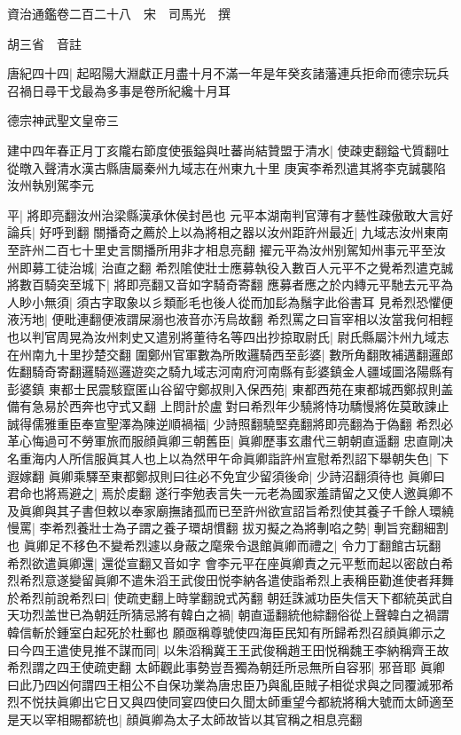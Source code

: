 資治通鑑卷二百二十八　宋　司馬光　撰

胡三省　音註

唐紀四十四|{
	起昭陽大淵獻正月盡十月不滿一年是年癸亥諸藩連兵拒命而德宗玩兵召禍日尋干戈最為多事是卷所紀纔十月耳}


德宗神武聖文皇帝三

建中四年春正月丁亥隴右節度使張鎰與吐蕃尚結贊盟于清水|{
	使疎吏翻鎰弋質翻吐從暾入聲清水漢古縣唐屬秦州九域志在州東九十里}
庚寅李希烈遣其將李克誠襲陷汝州執别駕李元

平|{
	將即亮翻汝州治梁縣漢承休侯封邑也}
元平本湖南判官薄有才藝性疎傲敢大言好論兵|{
	好呼到翻}
關播奇之薦於上以為將相之器以汝州距許州最近|{
	九域志汝州東南至許州二百七十里史言關播所用非才相息亮翻}
擢元平為汝州别駕知州事元平至汝州即募工徒治城|{
	治直之翻}
希烈隂使壯士應募執役入數百人元平不之覺希烈遣克誠將數百騎突至城下|{
	將即亮翻又音如字騎奇寄翻}
應募者應之於内縳元平馳去元平為人眇小無須|{
	須古字取象以彡類耏毛也後人從而加髟為鬚字此俗書耳}
見希烈恐懼便液汚地|{
	便毗連翻便液謂屎溺也液音亦汚烏故翻}
希烈罵之曰盲宰相以汝當我何相輕也以判官周晃為汝州刺史又遣别將董待名等四出抄掠取尉氏|{
	尉氏縣屬汴州九域志在州南九十里抄楚交翻}
圍鄭州官軍數為所敗邏騎西至彭婆|{
	數所角翻敗補邁翻邏郎佐翻騎奇寄翻邏騎廵邏遊奕之騎九域志河南府河南縣有彭婆鎮金人疆域圖洛陽縣有彭婆鎮}
東都士民震駭竄匿山谷留守鄭叔則入保西苑|{
	東都西苑在東都城西鄭叔則盖備有急易於西奔也守式又翻}
上問計於盧對曰希烈年少驍將恃功驕慢將佐莫敢諫止誠得儒雅重臣奉宣聖澤為陳逆順禍福|{
	少詩照翻驍堅堯翻將即亮翻為于偽翻}
希烈必革心悔過可不勞軍旅而服顔眞卿三朝舊臣|{
	眞卿歷事玄肅代三朝朝直遥翻}
忠直剛决名重海内人所信服眞其人也上以為然甲午命眞卿詣許州宣慰希烈詔下舉朝失色|{
	下遐嫁翻}
眞卿乘驛至東都鄭叔則曰往必不免宜少留須後命|{
	少詩沼翻須待也}
眞卿曰君命也將焉避之|{
	焉於䖍翻}
遂行李勉表言失一元老為國家羞請留之又使人邀眞卿不及眞卿與其子書但敕以奉家廟撫諸孤而已至許州欲宣詔旨希烈使其養子千餘人環繞慢罵|{
	李希烈養壯士為子謂之養子環胡慣翻}
拔刃擬之為將剸啗之勢|{
	剸旨兖翻細割也}
眞卿足不移色不變希烈遽以身蔽之麾衆令退館眞卿而禮之|{
	令力丁翻館古玩翻}
希烈欲遣眞卿還|{
	還從宣翻又音如字}
會李元平在座眞卿責之元平慙而起以密啟白希烈希烈意遂變留眞卿不遣朱滔王武俊田悦李納各遣使詣希烈上表稱臣勸進使者拜舞於希烈前說希烈曰|{
	使疏吏翻上時掌翻說式芮翻}
朝廷誅滅功臣失信天下都統英武自天功烈盖世已為朝廷所猜忌將有韓白之禍|{
	朝直遥翻統他綜翻俗從上聲韓白之禍謂韓信斬於鍾室白起死於杜郵也}
願亟稱尊號使四海臣民知有所歸希烈召顔眞卿示之曰今四王遣使見推不謀而同|{
	以朱滔稱冀王王武俊稱趙王田悦稱魏王李納稱齊王故希烈謂之四王使疏吏翻}
太師觀此事勢豈吾獨為朝廷所忌無所自容邪|{
	邪音耶}
眞卿曰此乃四凶何謂四王相公不自保功業為唐忠臣乃與亂臣賊子相從求與之同覆滅邪希烈不悦扶眞卿出它日又與四使同宴四使曰久聞太師重望今都統將稱大號而太師適至是天以宰相賜都統也|{
	顔眞卿為太子太師故皆以其官稱之相息亮翻}
